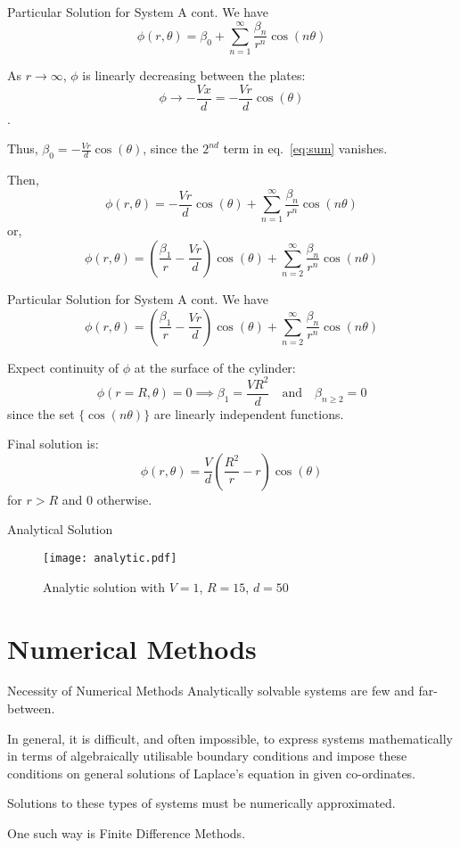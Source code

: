 \documentclass{beamer}
\newcommand{\be}{\begin{equation}}
\newcommand{\ee}{\end{equation}}
\begin{document}
\begin{frame}{Particular Solution for System A cont.}
We have
%
\be
\label{eq:sum}
\phi(r, \theta) = \beta_0 + \sum_{n=1}^{\infty} \frac{\beta_n}{r^n} \cos(n\theta)
\ee

As $r \rightarrow \infty$, $\phi$ is linearly decreasing between the plates:
%
\be
\phi \rightarrow -\frac{Vx}{d}=-\frac{Vr}{d}\cos(\theta)
\ee.

Thus, $\beta_0=-\frac{Vr}{d}\cos(\theta)$, since the $2^{nd}$ term in eq.~\ref{eq:sum} 
vanishes.

Then,
%
\be
\phi(r, \theta) = -\frac{Vr}{d}\cos(\theta) + \sum_{n=1}^{\infty} \frac{\beta_n}{r^n} \cos(n\theta)
\ee
%
or,
%
\be
\phi(r, \theta) = \left(\frac{\beta_1}{r}-\frac{Vr}{d}\right)\cos(\theta) + \sum_{n=2}^{\infty} \frac{\beta_n}{r^n} \cos(n\theta)
\ee

\end{frame}

\begin{frame}{Particular Solution for System A cont.}
We have
%
\be
\phi(r, \theta) = \left(\frac{\beta_1}{r}-\frac{Vr}{d}\right)\cos(\theta) + \sum_{n=2}^{\infty} \frac{\beta_n}{r^n} \cos(n\theta)
\ee

Expect continuity of $\phi$ at the surface of the cylinder:
%
\be
\phi(r=R,\theta) = 0 \implies \beta_1=\frac{VR^2}{d} \quad
\text{and} \quad \beta_{n \geq 2} = 0
\ee
%
since the set $\{\cos(n \theta)\}$ are linearly independent functions.

Final solution is:
%
\be
\phi(r, \theta) = \frac{V}{d}\left(\frac{R^2}{r}-r\right)\cos(\theta)
\ee
for $r>R$ and $0$ otherwise.

\end{frame}

\begin{frame}{Analytical Solution}

\begin{figure}[h!]
\begin{center}
\texttt{[image: analytic.pdf]}
\caption{Analytic solution with $V=1$, $R=15$, $d=50$}
\end{center}
\end{figure}

\end{frame}

\section{Numerical Methods}
\begin{frame}{Necessity of Numerical Methods}
Analytically solvable systems are few and far-between.

In general, it is difficult, and often impossible, to express systems mathematically
in terms of algebraically utilisable boundary conditions and impose these conditions
on general solutions of Laplace's equation in given co-ordinates.

Solutions to these types of systems must be numerically approximated.

One such way is Finite Difference Methods.
\end{frame}
\end{document}

